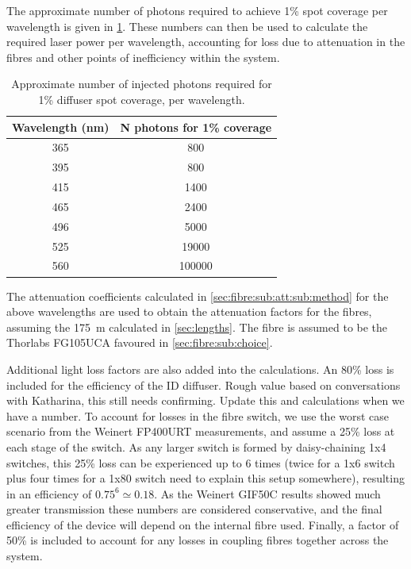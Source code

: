 \documentclass[a4paper,11pt]{article}
\begin{document}
The approximate number of photons required to achieve 1\% spot coverage per wavelength is given in \cref{tab:coverage}. These numbers can then be used to calculate the required laser power per wavelength, accounting for loss due to attenuation in the fibres and other points of inefficiency within the system.
\begin{table}[h]
\centering
\begin{tabular}{cc}
\hline
Wavelength (nm) & N photons for 1\% coverage \\ \hline
365 & 800 \\
395 & 800 \\
415 & 1400 \\
465 & 2400 \\
496 & 5000 \\
525 & 19000\\
560 & 100000 \\ \hline
\end{tabular}
\caption{Approximate number of injected photons required for 1\% diffuser spot coverage, per wavelength.}\label{tab:coverage}
\end{table}
The attenuation coefficients calculated in \cref{sec:fibre:sub:att:sub:method} for the above wavelengths are used to obtain the attenuation factors for the fibres, assuming the 175~m calculated in \cref{sec:lengths}. The fibre is assumed to be the Thorlabs FG105UCA favoured in \cref{sec:fibre:sub:choice}.

Additional light loss factors are also added into the calculations. An 80\% loss is included for the efficiency of the ID diffuser. {\color{red} Rough value based on conversations with Katharina, this still needs confirming. Update this and calculations when we have a number.} To account for losses in the fibre switch, we use the worst case scenario from the Weinert FP400URT measurements, and assume a 25\% loss at each stage of the switch. As any larger switch is formed by daisy-chaining 1x4 switches, this 25\% loss can be experienced up to 6 times (twice for a 1x6 switch plus four times for a 1x80 switch {\color{red} need to explain this setup somewhere}), resulting in an efficiency of $0.75^6 \simeq 0.18$. As the Weinert GIF50C results showed much greater transmission these numbers are considered conservative, and the final efficiency of the device will depend on the internal fibre used. Finally, a factor of 50\% is included to account for any losses in coupling fibres together across the system.
\end{document}
